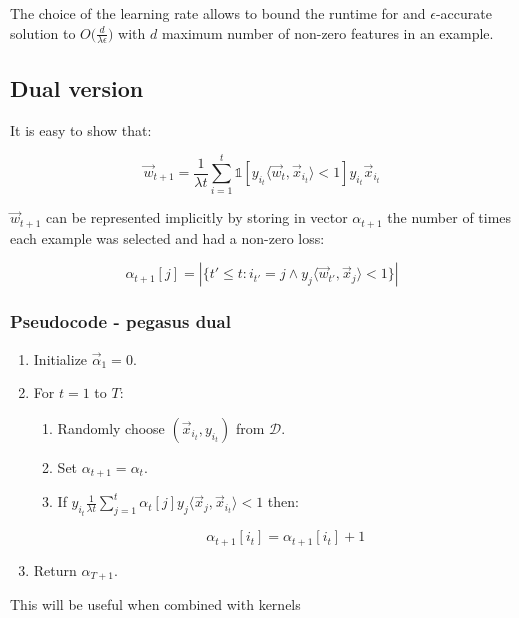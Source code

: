 		The choice of the learning rate allows to bound the runtime for and $\epsilon$-accurate solution to $O\biggl(\frac{d}{\lambda\epsilon}\biggr)$ with $d$ maximum number of non-zero features in an example.

	\subsection{Dual version}
	It is easy to show that:

	$$\vec{w}_{t+1} = \frac{1}{\lambda t}\sum\limits_{i=1}^t\mathbb{1}[y_{i_t}\langle\vec{w}_t, \vec{x}_{i_t}\rangle < 1]y_{i_t}\vec{x}_{i_t}$$

	$\vec{w}_{t+1}$ can be represented implicitly by storing in vector $\alpha_{t+1}$ the number of times each example was selected and had a non-zero loss:

	$$\alpha_{t+1}[j] = |\{t'\le t:i_{t'} = j\land y_j\langle\vec{w}_{t'},\vec{x}_j\rangle < 1\}|$$

		\subsubsection{Pseudocode - pegasus dual}

		\begin{enumerate}
			\item Initialize $\vec{\alpha}_1 = 0$.
			\item For $t = 1$ to $T$:
				\begin{enumerate}
					\item Randomly choose $(\vec{x}_{i_t}, y_{i_t})$ from $\mathcal{D}$.
					\item Set $\alpha_{t+1} = \alpha_t$.
					\item If $y_{i_t}\frac{1}{\lambda t}\sum\limits_{j=1}^t \alpha_t[j]y_j\langle\vec{x}_j, \vec{x}_{i_t}\rangle < 1$ then:

						$$\alpha_{t+1}[i_t] = \alpha_{t+1}[i_t] + 1$$
				\end{enumerate}
			\item Return $\alpha_{T+1}$.
		\end{enumerate}

		This will be useful when combined with kernels

